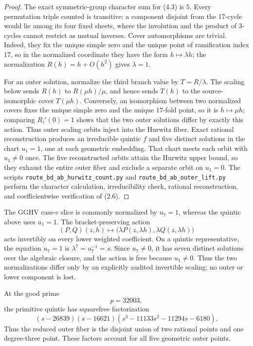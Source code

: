 \documentclass[11pt]{article}
\theoremstyle{definition}
\theoremstyle{remark}
\begin{document}
\begin{proof}
The exact symmetric-group character sum for (4.3) is \(5\).  Every
permutation triple counted is transitive: a component disjoint from the
17-cycle would lie among its four fixed sheets, where the involution and
the product of 3-cycles cannot restrict as mutual inverses.  Cover
automorphisms are trivial.  Indeed, they fix the unique simple zero and
the unique point of ramification index \(17\), so in the normalized
coordinate they have the form \(h\mapsto\lambda h\); the normalization
\(R(h)=h+O(h^2)\) gives \(\lambda=1\).

For an outer solution, normalize the third branch value by
\(T=R/\lambda\).  The scaling below sends
\(R(h)\) to \(R(\mu h)/\mu\), and hence sends \(T(h)\) to the
source-isomorphic cover \(T(\mu h)\).  Conversely, an isomorphism between
two normalized covers fixes the unique simple zero and the unique
\(17\)-fold point, so it is \(h\mapsto\mu h\); comparing
\(R_i'(0)=1\) shows that the two outer solutions differ by exactly this
action.  Thus outer scaling orbits inject into the Hurwitz fiber.
Exact rational reconstruction
produces an irreducible quintic \(f\) and five distinct solutions in the
chart \(u_1=1\), one at each geometric embedding.  That chart meets each
orbit with \(u_1\ne0\) once.  The five reconstructed orbits attain the
Hurwitz upper bound, so they exhaust the entire outer fiber and exclude
a separate orbit on \(u_1=0\).  The scripts
\texttt{route\_bd\_ab\_hurwitz\_count.py} and
\texttt{route\_bd\_ab\_outer\_lift.py} perform the character calculation,
irreducibility check, rational reconstruction, and coefficientwise
verification of (2.6).
\end{proof}

The GGHV case-c slice is commonly normalized by \(u_7=1\), whereas
the quintic above uses \(u_1=1\).  The bracket-preserving action
\[
 (P,Q)(z,h)\longmapsto
 \bigl(\lambda P(z,\lambda h),\lambda Q(z,\lambda h)\bigr)
\]
acts invertibly on every lower weighted coefficient.  On a quintic
representative, the equation \(u_7=1\) is
\(\lambda^7=u_7^{-1}=s\).  Since \(u_7\ne0\), it has seven distinct
solutions over the algebraic closure, and the action is free because
\(u_1\ne0\).  Thus the two normalizations differ only by an explicitly
audited invertible scaling; no outer or lower component is lost.

At the good prime
\[
   p=32003,                                             \tag{4.4}
\]
the primitive quintic has squarefree factorization
\[
 (s-26839)(s-16621)
 (s^3-11133s^2-11294s-6180).                           \tag{4.5}
\]
Thus the reduced outer fiber is the disjoint union of two rational points
and one degree-three point.  These factors account for all five geometric
outer points.
\end{document}
